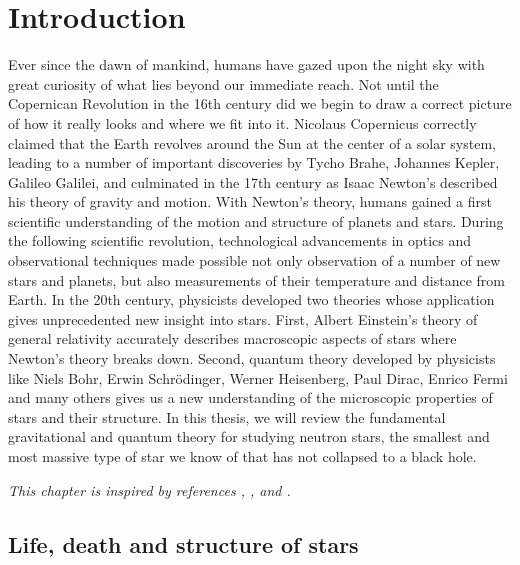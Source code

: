 \chapter{Introduction}
\label{chap:intro}


Ever since the dawn of mankind, humans have gazed upon the night sky with great curiosity of what lies beyond our immediate reach.
Not until the Copernican Revolution in the 16th century did we begin to draw a correct picture of how it really looks and where we fit into it.
Nicolaus Copernicus correctly claimed that the Earth revolves around the Sun at the center of a solar system, leading to a number of important discoveries by Tycho Brahe, Johannes Kepler, Galileo Galilei, and culminated in the 17th century as Isaac Newton's described his theory of gravity and motion.
With Newton's theory, humans gained a first scientific understanding of the motion and structure of planets and stars.
During the following scientific revolution, technological advancements in optics and observational techniques made possible not only observation of a number of new stars and planets, but also measurements of their temperature and distance from Earth.
In the 20th century, physicists developed two theories whose application gives unprecedented new insight into stars.
First, Albert Einstein's theory of general relativity accurately describes macroscopic aspects of stars where Newton's theory breaks down.
Second, quantum theory developed by physicists like Niels Bohr, Erwin Schrödinger, Werner Heisenberg, Paul Dirac, Enrico Fermi and many others gives us a new understanding of the microscopic properties of stars and their structure.
In this thesis, we will review the fundamental gravitational and quantum theory for studying neutron stars, the smallest and most massive type of star we know of that has not collapsed to a black hole.

\textit{This chapter is inspired by references \cite{ref:glendenning}, \cite{ref:neutron_star_physics}, \cite{ref:lovelace_summary} and \cite{ref:neutron_star_wikipedia}.}

\section{Life, death and structure of stars}

